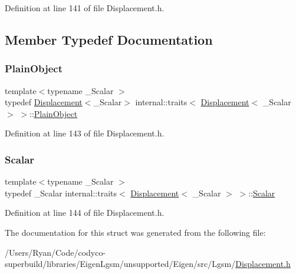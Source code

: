 Definition at line 141 of file Displacement.\+h.



\subsection{Member Typedef Documentation}
\hypertarget{structinternal_1_1traits_3_01_displacement_3_01___scalar_01_4_01_4_af6e4238e8d42d544cfad72771d52f368}{}\label{structinternal_1_1traits_3_01_displacement_3_01___scalar_01_4_01_4_af6e4238e8d42d544cfad72771d52f368} 
\subsubsection{\texorpdfstring{Plain\+Object}{PlainObject}}
{\footnotesize\ttfamily template$<$typename \+\_\+\+Scalar $>$ \\
typedef \hyperlink{class_displacement}{Displacement}$<$\+\_\+\+Scalar$>$ internal\+::traits$<$ \hyperlink{class_displacement}{Displacement}$<$ \+\_\+\+Scalar $>$ $>$\+::\hyperlink{structinternal_1_1traits_3_01_displacement_3_01___scalar_01_4_01_4_af6e4238e8d42d544cfad72771d52f368}{Plain\+Object}}



Definition at line 143 of file Displacement.\+h.

\hypertarget{structinternal_1_1traits_3_01_displacement_3_01___scalar_01_4_01_4_a599bdd94fc645c9d06a36202d58f0ed8}{}\label{structinternal_1_1traits_3_01_displacement_3_01___scalar_01_4_01_4_a599bdd94fc645c9d06a36202d58f0ed8} 
\subsubsection{\texorpdfstring{Scalar}{Scalar}}
{\footnotesize\ttfamily template$<$typename \+\_\+\+Scalar $>$ \\
typedef \+\_\+\+Scalar internal\+::traits$<$ \hyperlink{class_displacement}{Displacement}$<$ \+\_\+\+Scalar $>$ $>$\+::\hyperlink{structinternal_1_1traits_3_01_displacement_3_01___scalar_01_4_01_4_a599bdd94fc645c9d06a36202d58f0ed8}{Scalar}}



Definition at line 144 of file Displacement.\+h.



The documentation for this struct was generated from the following file\+:\begin{DoxyCompactItemize}
\item 
/\+Users/\+Ryan/\+Code/codyco-\/superbuild/libraries/\+Eigen\+Lgsm/unsupported/\+Eigen/src/\+Lgsm/\hyperlink{_displacement_8h}{Displacement.\+h}\end{DoxyCompactItemize}
